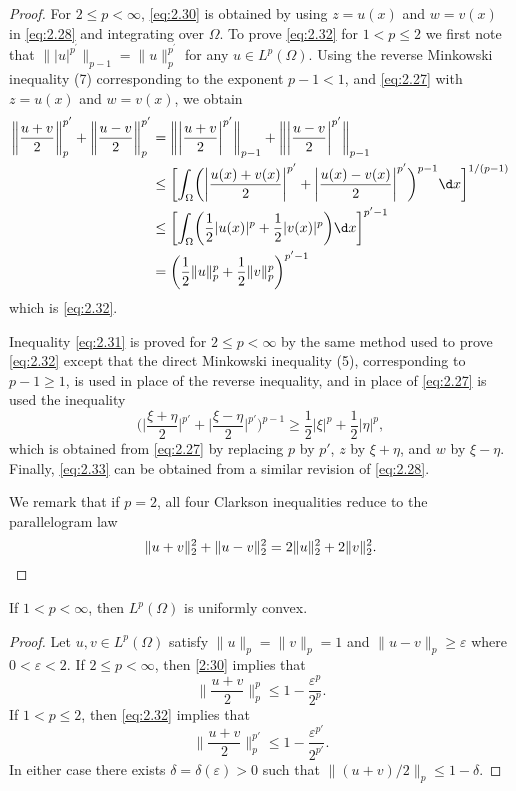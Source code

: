 \begin{proof}
  For $2\leq p<\infty$, \eqref{eq:2.30} is obtained by using $z=u(x)$ and $w=v(x)$ 
  in \eqref{eq:2.28} and integrating over $\Omega$.
  To prove \eqref{eq:2.32} for $1<p \leq 2$ we first note that
  $\bigl\||u|^{p^{\prime}}\bigr\|_{p-1}=\|u\|_p^{p^{\prime}}$ for any $u \in L^p(\Omega)$. 
  Using the reverse Minkowski inequality (7) corresponding to the exponent $p-1<1$,
  and \eqref{eq:2.27} with $z=u(x)$ and $w = v(x)$, we obtain
  \begin{align*}
    \biggl\|\frac{u+v}{2}\biggr\|_p^{p'}
    + \biggl\|\frac{u-v}{2}\biggr\|_p^{p'}
    & = \biggl\| \biggl|\frac{u+v}{2}\biggr|^{p'} \biggr\|_{p-1}
      + \biggl\| \biggl|\frac{u-v}{2}\biggr|^{p'} \biggr\|_{p-1} \\
    & \leq \biggl[\int_{\Omega} \biggl(\biggl|\frac{u(x)+v(x)}{2}\biggr|^{p'}
        + \biggl|\frac{u(x)-v(x)}{2}\biggr|^{p'}\biggr)^{p-1} \d x\biggr]^{1/(p-1)} \\
    & \leq \biggl[\int_\Omega \biggl(\frac12 |u(x)|^p + \frac12 |v(x)|^p\biggr) \d x\biggr]^{p'-1} \\
    & = \biggl(\frac12 \|u\|_p^p + \frac12 \|v\|_p^p\biggr)^{p'-1}
  \end{align*}
  which is \eqref{eq:2.32}.

  Inequality \eqref{eq:2.31} is proved for $2\leq p<\infty$ by the same method
  used to prove \eqref{eq:2.32} except that the direct Minkowski inequality (5),
  corresponding to $p-1\geq 1$, is used in place of the reverse inequality,
  and in place of \eqref{eq:2.27} is used the inequality
  \[\biggl(\biggl|\frac{\xi+\eta}{2}\biggr|^{p'}
    + \biggl|\frac{\xi-\eta}{2}\biggr|^{p'}\biggr)^{p-1}
    \geq \frac12 |\xi|^p + \frac12 |\eta|^p,\]
  which is obtained from \eqref{eq:2.27} by replacing $p$ by $p'$,
  $z$ by $\xi+\eta$, and $w$ by $\xi-\eta$.
  Finally, \eqref{eq:2.33} can be obtained from a similar revision of \eqref{eq:2.28}.

  We remark that if $p=2$, all four Clarkson inequalities reduce to the
  parallelogram law
  \[\|u+v\|_2^2 + \|u-v\|_2^2 = 2\|u\|_2^2 + 2\|v\|_2^2. \qedhere\]
\end{proof}


\begin{theorem}\label{thm:2.39}
  If $1<p<\infty$, then $L^p(\Omega)$ is uniformly convex.
\end{theorem}

\begin{proof}
  Let $u,v\in L^p(\Omega)$ satisfy $\|u\|_p = \|v\|_p = 1$ and $\|u-v\|_p\geq\varepsilon$
  where $0<\varepsilon<2$. If $2\leq p<\infty$, then \eqref{2:30} implies that
  \[\biggl\|\frac{u+v}{2}\biggr\|_p^p \leq 1 - \frac{\varepsilon^p}{2^p}.\]
  If $1<p\leq 2$, then \eqref{eq:2.32} implies that 
  \[\biggl\|\frac{u+v}{2}\biggr\|_p^{p'} \leq 1 - \frac{\varepsilon^{p'}}{2^{p'}}.\]
  In either case there exists $\delta = \delta(\varepsilon) > 0$
  such that $\|(u+v)/2\|_p \leq 1-\delta$.
\end{proof}

